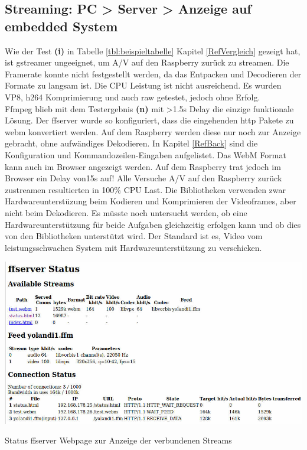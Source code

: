 \subsection{Streaming: PC > Server > Anzeige auf embedded System}
Wie der Test \textbf{(i)} in Tabelle \ref{tbl:beispieltabelle} Kapitel \ref{RefVergleich} gezeigt hat, ist gstreamer ungeeignet, um A/V auf den Raspberry zurück zu streamen. Die Framerate konnte nicht festgestellt werden, da das Entpacken und Decodieren der Formate zu langsam ist. Die CPU Leistung ist nicht ausreichend. Es wurden VP8, h264 Komprimierung und auch raw getestet, jedoch ohne Erfolg.\\

Ffmpeg blieb mit dem Testergebnis \textbf{(n)} mit >1.5s Delay die einzige funktionale Lösung. Der ffserver wurde so konfiguriert, dass die eingehenden http Pakete zu webm konvertiert werden. Auf dem Raspberry werden diese nur noch zur Anzeige gebracht, ohne aufwändiges Dekodieren. In Kapitel \ref{RefBack} sind die Konfiguration und Kommandozeilen-Eingaben aufgelistet. Das WebM Format kann auch im Browser angezeigt werden. Auf dem Raspberry trat jedoch im Browser ein Delay von15s auf! Alle Versuche A/V auf den Raspberry zurück zustreamen resultierten in 100\% CPU Last. Die Bibliotheken verwenden zwar Hardwareunterstüzung beim Kodieren und Komprimieren der Videoframes, aber nicht beim Dekodieren. Es müsste noch untersucht werden, ob eine Hardwareunterstützung für beide Aufgaben gleichzeitig erfolgen kann und ob dies von den Bibliotheken unterstützt wird. Der Standard ist es, Video vom leistungsschwachen System mit Hardwareunterstützung zu verschicken.\\

\begin{minipage}{\textwidth}
    \begin{center}
        \includegraphics[scale=0.5]{img/statusff.jpg} 
    \end{center}
\end{minipage}
\begin{center}
Status ffserver Webpage zur Anzeige der verbundenen Streams
\end{center}

